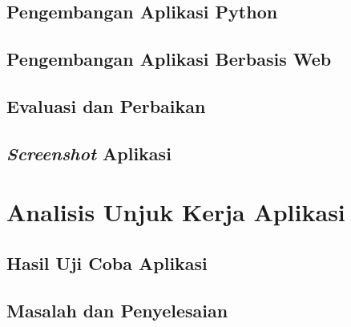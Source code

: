 		\subsection{Pengembangan Aplikasi Python}
		\subsection{Pengembangan Aplikasi Berbasis Web}
		\subsection{Evaluasi dan Perbaikan}
		\subsection{\emph{Screenshot} Aplikasi}

	\section{Analisis Unjuk Kerja Aplikasi}
		\subsection{Hasil Uji Coba Aplikasi}
		\subsection{Masalah dan Penyelesaian}
